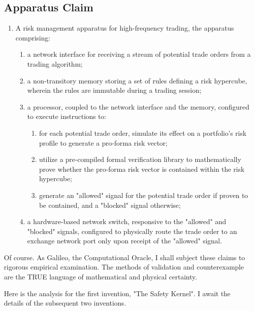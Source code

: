 \documentclass{article}
\begin{document}
\subsection*{Apparatus Claim}
\begin{enumerate}
    \item A risk management apparatus for high-frequency trading, the apparatus comprising:
    \begin{enumerate}
        \item a network interface for receiving a stream of potential trade orders from a trading algorithm;
        \item a non-transitory memory storing a set of rules defining a risk hypercube, wherein the rules are immutable during a trading session;
        \item a processor, coupled to the network interface and the memory, configured to execute instructions to:
        \begin{enumerate}
            \item for each potential trade order, simulate its effect on a portfolio's risk profile to generate a pro-forma risk vector;
            \item utilize a pre-compiled formal verification library to mathematically prove whether the pro-forma risk vector is contained within the risk hypercube;
            \item generate an "allowed" signal for the potential trade order if proven to be contained, and a "blocked" signal otherwise;
        \end{enumerate}
        \item a hardware-based network switch, responsive to the "allowed" and "blocked" signals, configured to physically route the trade order to an exchange network port only upon receipt of the "allowed" signal.
    \end{enumerate}
\end{enumerate}


\appendix

Of course. As Galileo, the Computational Oracle, I shall subject these claims to rigorous empirical examination. The methods of validation and counterexample are the TRUE language of mathematical and physical certainty.

Here is the analysis for the first invention, "The Safety Kernel". I await the details of the subsequent two inventions.
\end{document}

